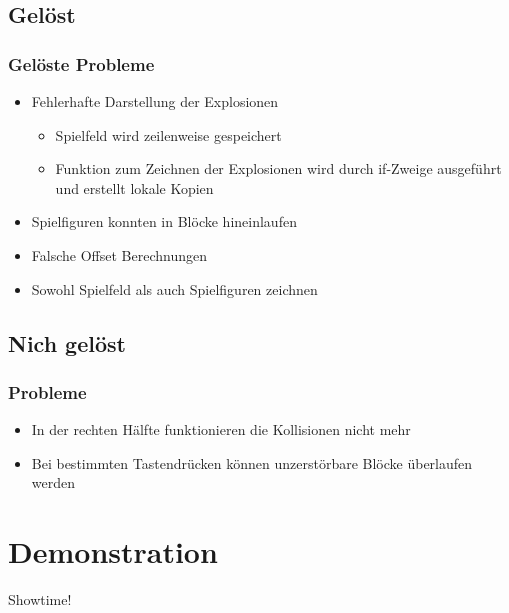 \documentclass[18pt]{beamer}
\begin{document}
	\subsection{Gelöst}
	\begin{frame}
		\frametitle{Gelöste Probleme}
		\begin{itemize}
			\item Fehlerhafte Darstellung der Explosionen
			\begin{itemize}
				\item Spielfeld wird zeilenweise gespeichert
				\item Funktion zum Zeichnen der Explosionen wird durch if-Zweige ausgeführt und erstellt lokale Kopien
			\end{itemize}
			\item Spielfiguren konnten in Blöcke hineinlaufen
			\item Falsche Offset Berechnungen
			\item Sowohl Spielfeld als auch Spielfiguren zeichnen
		\end{itemize}
	\end{frame}
	
	\subsection{Nich gelöst}
	\begin{frame}
		\frametitle{Probleme}
		\begin{itemize}
			\item In der rechten Hälfte funktionieren die Kollisionen nicht mehr
			\item Bei bestimmten Tastendrücken können unzerstörbare Blöcke überlaufen werden
		\end{itemize}
\end{frame}

\section{Demonstration}
	\begin{frame}
		\centering \huge	Showtime!
\end{frame}
		
\end{document}
